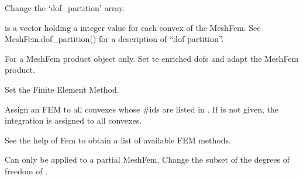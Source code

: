 \documentclass[a4paper,11pt,english]{sphinxmanual}
\begin{document}
\begin{fulllineitems}

\begin{fulllineitems}
\label{\detokenize{python/cmdref_MeshFem:getfem.MeshFem.set_dof_partition}}
Change the ‘dof\_partition’ array.

 is a vector holding a integer value for each convex of the MeshFem.
See MeshFem.dof\_partition() for a description of “dof partition”.

\end{fulllineitems}


\begin{fulllineitems}
\label{\detokenize{python/cmdref_MeshFem:getfem.MeshFem.set_enriched_dofs}}
For a MeshFem product object only. Set te enriched dofs and adapt the MeshFem product.

\end{fulllineitems}


\begin{fulllineitems}
\label{\detokenize{python/cmdref_MeshFem:getfem.MeshFem.set_fem}}
Set the Finite Element Method.

Assign an FEM  to all convexes whose \#ids are listed in .
If  is not given, the integration is assigned to all convexes.

See the help of Fem to obtain a list of available FEM methods.

\end{fulllineitems}


\begin{fulllineitems}
\label{\detokenize{python/cmdref_MeshFem:getfem.MeshFem.set_partial}}
Can only be applied to a partial MeshFem. Change the subset of the
degrees of freedom of .


\end{fulllineitems}
\end{fulllineitems}
\end{document}
